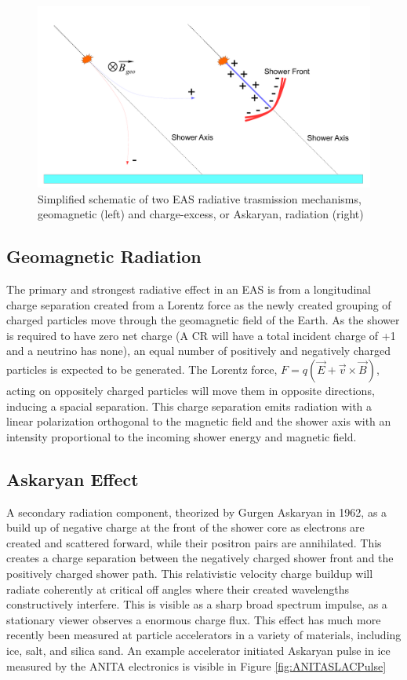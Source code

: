 \begin{figure}
	\centering
	\includegraphics[width=\textwidth]{figures/EASRadiation}
	\caption{Simplified schematic of two EAS radiative trasmission mechanisms, geomagnetic (left) and charge-excess, or Askaryan, radiation (right)}
	\label{fig:EASRadiation}
\end{figure}

	
	\subsection{Geomagnetic Radiation}
		The primary and strongest radiative effect in an EAS is from a longitudinal charge separation created from a Lorentz force as the newly created grouping of charged particles move through the geomagnetic field of the Earth.  As the shower is required to have zero net charge (A CR will have a total incident charge of +1 and a neutrino has none), an equal number of positively and negatively charged particles is expected to be generated.  The Lorentz force, $F=q(\vec{E}+\vec{v}\times\vec{B})$, acting on oppositely charged particles will move them in opposite directions, inducing a spacial separation.  This charge separation emits radiation with a linear polarization orthogonal to the magnetic field and the shower axis with an intensity proportional to the incoming shower energy and magnetic field.
	\subsection{Askaryan Effect}
		A secondary radiation component, theorized by Gurgen Askaryan in 1962, as a build up of negative charge at the front of the shower core as electrons are created and scattered forward, while their positron pairs are annihilated.\cite{Askaryan:1962hbi}  This creates a charge separation between the negatively charged shower front and the positively charged shower path.  This relativistic velocity charge buildup will radiate coherently at critical off angles where their created wavelengths constructively interfere.  This is visible as a sharp broad spectrum impulse, as a stationary viewer observes a enormous charge flux.\cite{PhysRevD.84.103003}  This effect has much more recently been measured at particle accelerators in a variety of materials, including ice,\cite{PhysRevLett.99.171101} salt\cite{PhysRevD.72.023002}, and silica sand\cite{PhysRevLett.86.2802}.  An example accelerator initiated Askaryan pulse in ice measured by the ANITA electronics is visible in Figure \ref{fig:ANITASLACPulse}
		

